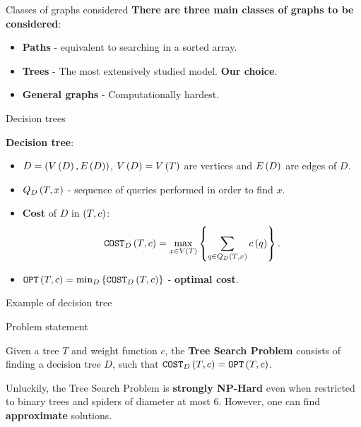 \begin{frame}{Classes of graphs considered}
	\textbf{There are three main classes of graphs to be considered}:
	\begin{itemize}
	\item \textbf{Paths} - equivalent to searching in a sorted array. 
    \pause
	\item \textbf{Trees} -  The most extensively studied model. \textbf{Our choice}.
    \pause
    \item \textbf{General graphs} - Computationally hardest.
	\end{itemize}
\end{frame}

\begin{frame}{Decision trees}
        \begin{definition}
        \textbf{Decision tree}:
        \begin{itemize}
            \item $D=\left( V\left( D \right), E\left( D \right) \right)$, $V\left( D \right)=V\left( T \right)$ are vertices and $E\left( D \right)$ are edges of $D$.
            \pause
            \item $Q_D\left( T,x \right)$ - sequence of queries performed in order to find $x$.
            \pause
            \item \textbf{Cost} of $D$ in $\left( T,c \right)$:
            $$
\texttt{COST}_D\left( T, c \right) = \max_{x\in V\left( T \right)} \left\{ \sum_{q\in Q_{D}\left( T,x \right)}c\left( q \right) \right\}.
$$
            \pause
        \item $\texttt{OPT}\left( T, c \right) = \min_{D} \left\{ \texttt{COST}_D\left( T, c \right) \right\}$ - \textbf{optimal cost}.
        \end{itemize}
        \end{definition}
\end{frame}

\begin{frame}{Example of decision tree}
    
\end{frame}

\begin{frame}{Problem statement}

    \begin{definition}
        Given a tree $T$ and weight function $c$, the \textbf{Tree Search Problem} consists of finding a decision tree $D$, such that $\texttt{COST}_D\left( T,c \right)=\texttt{OPT}\left( T,c \right)$.
    \end{definition}

    \pause

    Unluckily, the Tree Search Problem is \textbf{strongly NP-Hard} even when restricted to binary trees and spiders of diameter at most 6. However, one can find \textbf{approximate} solutions. 

\end{frame}
